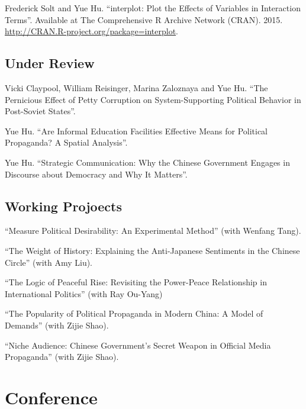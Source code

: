 \documentclass[10.5pt,]{article}
\begin{document}
Frederick Solt and Yue Hu. ``interplot: Plot the Effects of Variables in
Interaction Terms''. Available at The Comprehensive R Archive Network
(CRAN). 2015. \url{http://CRAN.R-project.org/package=interplot}.

\subsection{Under Review}\label{under-review}

Vicki Claypool, William Reisinger, Marina Zaloznaya and Yue Hu. ``The
Pernicious Effect of Petty Corruption on System-Supporting Political
Behavior in Post-Soviet States''.

Yue Hu. ``Are Informal Education Facilities Effective Means for
Political Propaganda? A Spatial Analysis''.

Yue Hu. ``Strategic Communication: Why the Chinese Government Engages in
Discourse about Democracy and Why It Matters''.

\subsection{Working Projoects}\label{working-projoects}

``Measure Political Desirability: An Experimental Method'' (with Wenfang
Tang).

``The Weight of History: Explaining the Anti-Japanese Sentiments in the
Chinese Circle'' (with Amy Liu).

``The Logic of Peaceful Rise: Revisiting the Power-Peace Relationship in
International Politics'' (with Ray Ou-Yang)

``The Popularity of Political Propaganda in Modern China: A Model of
Demands'' (with Zijie Shao).

``Niche Audience: Chinese Government's Secret Weapon in Official Media
Propaganda'' (with Zijie Shao).

\section{Conference}\label{conference}
\end{document}
